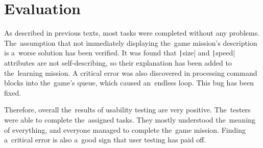 \section{Evaluation}

As described in previous texts, most tasks were completed without any problems.
The~assumption that not immediately displaying the~game mission's description is a~worse solution has been verified.
It was found that \texttt|size| and \texttt|speed| attributes are not self-describing, so their explanation has been added to the~learning mission.
A critical error was also discovered in processing command blocks into the~game's queue, which caused an~endless loop.
This bug has been fixed.

Therefore, overall the~results of usability testing are very positive.
The~testers were able to complete the~assigned tasks.
They mostly understood the~meaning of everything, and everyone managed to complete the~game mission.
Finding a~critical error is also a~good sign that user testing has paid off.
